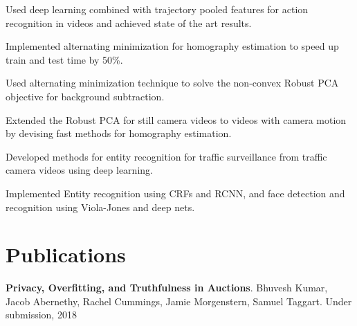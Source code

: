 \documentclass[US paper]{deedy-resume} %
\begin{document}
\begin{tightitemize}
\item Used deep learning combined with trajectory pooled features for action recognition in videos and achieved state of the art results.
\item Implemented alternating minimization for homography estimation to speed up train and test time by 50\%.
\end{tightitemize}
\vspace{1mm}



\begin{tightitemize}
\item Used alternating minimization technique to solve the non-convex Robust PCA objective for background subtraction.
\item Extended the Robust PCA for still camera videos to videos with camera motion by devising fast methods for homography estimation.
\end{tightitemize}
\vspace{1mm}



\begin{tightitemize}
\item Developed methods for entity recognition for traffic surveillance from traffic camera videos using deep learning.
\item Implemented Entity recognition using CRFs and RCNN, and face detection and recognition using Viola-Jones and deep nets.
\end{tightitemize}
\vspace{1mm}

\vspace{-2.5pt}
\section{Publications}
\begin{enumerate}[label={[\arabic*]}]
  \item \textbf{Privacy, Overfitting, and Truthfulness in Auctions}. Bhuvesh Kumar, Jacob Abernethy, Rachel Cummings, Jamie Morgenstern, Samuel Taggart. Under submission, 2018
\end{enumerate}
\vspace{-10pt}
\end{document}
